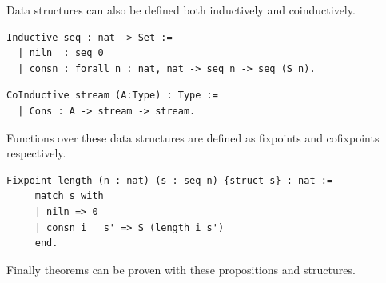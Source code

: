 \documentclass[12pt,twoside,notitlepage]{report}
\begin{document}
Data structures can also be defined both inductively and coinductively.


\begin{lstlisting}[language={Coq},caption={Coq inductive data structure example}]
 Inductive seq : nat -> Set :=
  | niln  : seq 0
  | consn : forall n : nat, nat -> seq n -> seq (S n).
\end{lstlisting}



\begin{lstlisting}[language={Coq},caption={Coq coinductive data structure example}]
 CoInductive stream (A:Type) : Type :=
  | Cons : A -> stream -> stream.
\end{lstlisting}


Functions over these data structures are defined as fixpoints and cofixpoints respectively.


\begin{lstlisting}[language={Coq},caption={Coq fixpoint example}]
 Fixpoint length (n : nat) (s : seq n) {struct s} : nat := 
     match s with
     | niln => 0
     | consn i _ s' => S (length i s')
     end.
\end{lstlisting}


Finally theorems can be proven with these propositions and structures.
\end{document}
